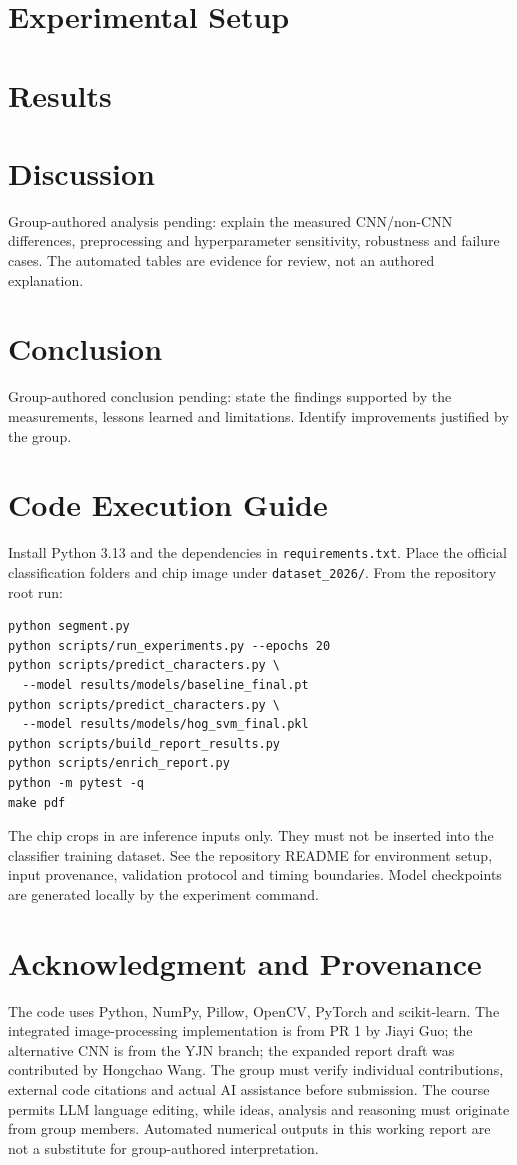 \documentclass[11pt,a4paper]{article}
\begin{document}
\section{Experimental Setup}



\section{Results}

\clearpage


\section{Discussion}
Group-authored analysis pending: explain the measured CNN/non-CNN differences,
preprocessing and hyperparameter sensitivity, robustness and failure cases.
The automated tables are evidence for review, not an authored explanation.

\section{Conclusion}
Group-authored conclusion pending: state the findings supported by the
measurements, lessons learned and limitations.
Identify improvements justified by the group.

\section*{Code Execution Guide}
Install Python 3.13 and the dependencies in \texttt{requirements.txt}.
Place the official classification folders and chip image under
\texttt{dataset\_2026/}. From the repository root run:
\begin{verbatim}
python segment.py
python scripts/run_experiments.py --epochs 20
python scripts/predict_characters.py \
  --model results/models/baseline_final.pt
python scripts/predict_characters.py \
  --model results/models/hog_svm_final.pkl
python scripts/build_report_results.py
python scripts/enrich_report.py
python -m pytest -q
make pdf
\end{verbatim}
The chip crops in  are inference
inputs only. They must not be inserted into the classifier training dataset.
See the repository README for environment setup, input provenance,
validation protocol and timing boundaries. Model checkpoints are generated
locally by the experiment command.
\section*{Acknowledgment and Provenance}
The code uses Python, NumPy, Pillow, OpenCV, PyTorch and scikit-learn.
The integrated image-processing implementation is from PR 1 by Jiayi Guo;
the alternative CNN is from the YJN branch; the expanded report draft
was contributed by Hongchao Wang. The group must verify individual
contributions, external code citations and actual AI assistance before
submission. The course permits LLM language editing, while ideas, analysis
and reasoning must originate from group members. Automated numerical
outputs in this working report are not a substitute for group-authored
interpretation.


\end{document}

